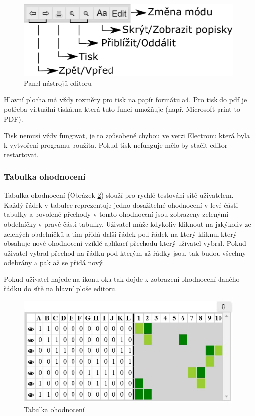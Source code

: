 \documentclass[
  biblatex,
  glossaries,
  index
]{kidiplom}
\begin{document}
\begin{figure}[h]
  \centering
  \includegraphics[width=\linewidth]{bar}
  \caption{Panel nástrojů editoru}\label{fig:Panel nástrojů editoru}
\end{figure}

\label{tisk}

Hlavní plocha má vždy rozměry pro tisk na papír formátu a4. Pro tisk 
do pdf je potřeba virtuální tiskárna která tuto funci umožňuje (např. Microsoft print to PDF).

Tisk nemusí vždy fungovat, je to způsobené chybou ve verzi Electronu 
která byla k vytvoření programu použita. Pokud tisk 
nefunguje mělo by stačit editor restartovat.

\subsubsection{Tabulka ohodnocení}\label{tabulka ohodnocení}

Tabulka ohodnocení (Obrázek \ref{fig:Tabulka ohodnocení obrázek}) slouží pro rychlé testování sítě uživatelem.
Každý řádek v tabulce reprezentuje jedno dosažitelné ohodnocení 
v levé části tabulky a povolené přechody v tomto ohodnocení jsou 
zobrazeny zelenými obdelníčky v pravé části tabulky.
Uživatel může kdykoliv kliknout na jakýkoliv ze zelených obdelníčků 
a tím přidá další řádek pod řádek na který kliknul který obsahuje 
nové ohodnocení vzíklé aplikací přechodu který uživatel vybral.
Pokud uživatel vybral přechod na řádku pod kterým už řádky jsou, 
tak budou všechny odebrány a pak až se přidá nový.

Pokud uživatel najede na ikonu oka tak dojde k zobrazení ohodnocení 
daného řádku do sítě na hlavní ploše editoru.

\begin{figure}[h]
  \centering
  \includegraphics[width=\linewidth]{tabulka}
  \caption{Tabulka ohodnocení}\label{fig:Tabulka ohodnocení obrázek}
\end{figure}
\end{document}
